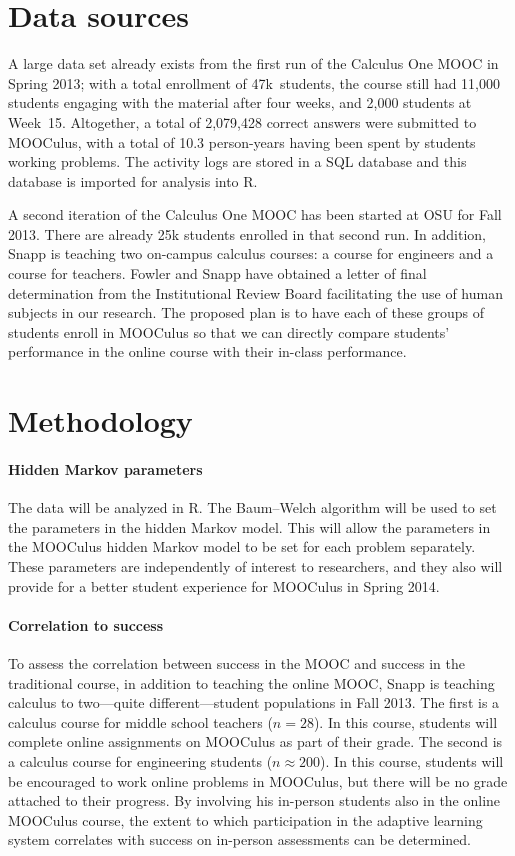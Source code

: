 \documentclass[12pt]{article}
\begin{document}
\section{Data sources}

A large data set already exists from the first run of the Calculus One
MOOC in Spring 2013; with a total enrollment of 47k~students, the
course still had 11,000 students engaging with the material after four
weeks, and 2,000 students at Week~15.  Altogether, a total of
2,079,428 correct answers were submitted to MOOCulus, with a total of
10.3 person-years having been spent by students working problems.  The
activity logs are stored in a SQL database and this database is
imported for analysis into R.

A second iteration of the Calculus One MOOC has been started at OSU
for Fall 2013.  There are already 25k students enrolled in that second
run.  In addition, Snapp is teaching two on-campus calculus courses: a
course for engineers and a course for teachers.  Fowler and Snapp have
obtained a letter of final determination from the Institutional Review
Board facilitating the use of human subjects in our research.  The
proposed plan is to have each of these groups of students enroll in
MOOCulus so that we can directly compare students' performance in the
online course with their in-class performance.

\section{Methodology}

\paragraph{Hidden Markov parameters}

The data will be analyzed in R. The Baum--Welch algorithm will be used
to set the parameters in the hidden Markov model. This will allow the
parameters in the MOOCulus hidden Markov model to be set for each
problem separately.  These parameters are independently of interest to
researchers, and they also will provide for a better student
experience for MOOCulus in Spring 2014.

\paragraph{Correlation to success}

To assess the correlation between success in the MOOC and success in
the traditional course, in addition to teaching the online MOOC, Snapp
is teaching calculus to two---quite different---student populations in
Fall 2013.  The first is a calculus course for middle school teachers
($n=28$). In this course, students will complete online assignments on
MOOCulus as part of their grade.  The second is a calculus course for
engineering students ($n\approx 200$).  In this course, students will
be encouraged to work online problems in MOOCulus, but there will be
no grade attached to their progress.  By involving his in-person
students also in the online MOOCulus course, the extent to which
participation in the adaptive learning system correlates with success
on in-person assessments can be determined.
\end{document}
